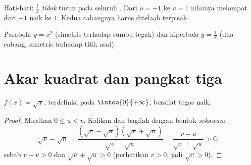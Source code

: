 \begin{remark}
Hati-hati: $\frac1x$ \emph{tidak} turun pada seluruh . Dari
$u = -1$ ke $v = 1$ nilainya melompat dari $-1$ naik ke $1$. Kedua cabangnya
harus ditelaah terpisah.
\end{remark}

\begin{omfigure}
\hfill
{}

{\small Parabola $y = x^2$ (simetris terhadap sumbu tegak) dan
hiperbola $y = \frac1x$ (dua cabang, simetris terhadap titik asal).}
\end{omfigure}

\section{Akar kuadrat dan pangkat tiga}

\begin{proposition}\label{prop:g10:reffunc:sqrt}
 $f(x) = \sqrt{x}$, terdefinisi pada $\intco{0}{+\infty}$, bersifat
tegas naik.
\end{proposition}

\begin{proof}
Misalkan $0 \leq u < v$. Kalikan dan bagilah dengan bentuk \emph{sekawan}:
\[
\sqrt v - \sqrt u
= \frac{(\sqrt v - \sqrt u)(\sqrt v + \sqrt u)}{\sqrt v + \sqrt u}
= \frac{v - u}{\sqrt v + \sqrt u} > 0,
\]
sebab $v - u > 0$ dan $\sqrt v + \sqrt u > 0$ (perhatikan $v > 0$, jadi
$\sqrt v > 0$).
\end{proof}

